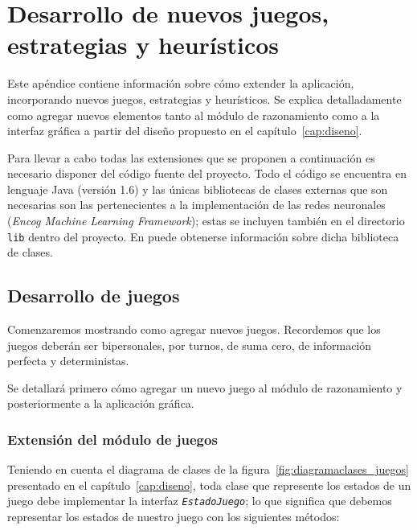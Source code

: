
\chapter{Desarrollo de nuevos juegos, estrategias y heurísticos}
\label{cap:desarrollo_juegos_estrategias_heuristicos}
Este apéndice contiene información sobre cómo extender la aplicación, incorporando nuevos juegos, estrategias y heurísticos.
Se explica detalladamente como agregar nuevos elementos tanto al módulo de razonamiento como a la interfaz gráfica a partir del diseño propuesto en el capítulo~\ref{cap:diseno}.

\bigskip
Para llevar a cabo todas las extensiones que se proponen a continuación es necesario disponer del código fuente del proyecto.
Todo el código se encuentra en lenguaje Java (versión 1.6) y las únicas bibliotecas de clases externas que son necesarias son las pertenecientes a la implementación de las redes neuronales (\textit{Encog Machine Learning Framework}); estas se incluyen también en el directorio \texttt{lib} dentro del proyecto.
En  puede obtenerse información sobre dicha biblioteca de clases.

\section{Desarrollo de juegos}
\label{sec:desarrollo_juegos}
Comenzaremos mostrando como agregar nuevos juegos.
Recordemos que los juegos deberán ser bipersonales, por turnos, de suma cero, de información perfecta y deterministas.

Se detallará primero cómo agregar un nuevo juego al módulo de razonamiento y posteriormente a la aplicación gráfica.

\subsection{Extensión del módulo de juegos}
\label{ssec:extension_modulo_juegos}
Teniendo en cuenta el diagrama de clases de la figura~\ref{fig:diagramaclases_juegos} presentado en el capítulo~\ref{cap:diseno}, 
toda clase que represente los estados de un juego debe implementar la interfaz \texttt{\textit{EstadoJuego}}; lo que significa que debemos representar los estados de nuestro juego con los siguientes métodos:

